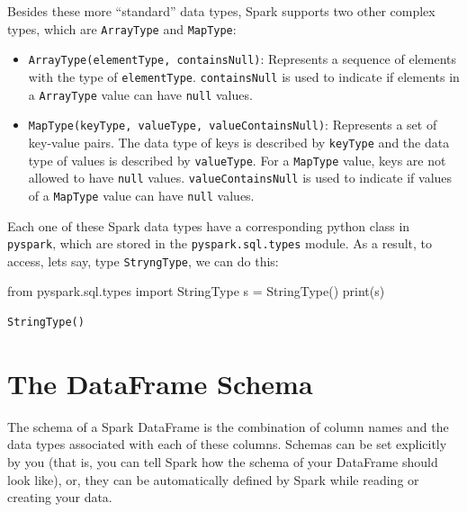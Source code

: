 \documentclass[
  11pt,
  letterpaper,
  DIV=11,
  numbers=noendperiod]{scrreprt}
\newenvironment{Shaded}{\begin{snugshade}}{\end{snugshade}}
\newcommand{\BuiltInTok}[1]{\textcolor[rgb]{0.00,0.23,0.31}{#1}}
\newcommand{\ImportTok}[1]{\textcolor[rgb]{0.00,0.46,0.62}{#1}}
\newcommand{\NormalTok}[1]{\textcolor[rgb]{0.00,0.23,0.31}{#1}}
\newcommand{\OperatorTok}[1]{\textcolor[rgb]{0.37,0.37,0.37}{#1}}
\begin{document}
Besides these more ``standard'' data types, Spark supports two other
complex types, which are \texttt{ArrayType} and \texttt{MapType}:

\begin{itemize}
\item
  \texttt{ArrayType(elementType,\ containsNull)}: Represents a sequence
  of elements with the type of \texttt{elementType}.
  \texttt{containsNull} is used to indicate if elements in a
  \texttt{ArrayType} value can have \texttt{null} values.
\item
  \texttt{MapType(keyType,\ valueType,\ valueContainsNull)}: Represents
  a set of key-value pairs. The data type of keys is described by
  \texttt{keyType} and the data type of values is described by
  \texttt{valueType}. For a \texttt{MapType} value, keys are not allowed
  to have \texttt{null} values. \texttt{valueContainsNull} is used to
  indicate if values of a \texttt{MapType} value can have \texttt{null}
  values.
\end{itemize}

Each one of these Spark data types have a corresponding python class in
\texttt{pyspark}, which are stored in the \texttt{pyspark.sql.types}
module. As a result, to access, lets say, type \texttt{StryngType}, we
can do this:

\begin{Shaded}
\begin{Highlighting}[]
\ImportTok{from}\NormalTok{ pyspark.sql.types }\ImportTok{import}\NormalTok{ StringType}
\NormalTok{s }\OperatorTok{=}\NormalTok{ StringType()}
\BuiltInTok{print}\NormalTok{(s)}
\end{Highlighting}
\end{Shaded}

\begin{verbatim}
StringType()
\end{verbatim}

\hypertarget{sec-dataframe-schema}{%
\section{The DataFrame Schema}\label{sec-dataframe-schema}}

The schema of a Spark DataFrame is the combination of column names and
the data types associated with each of these columns. Schemas can be set
explicitly by you (that is, you can tell Spark how the schema of your
DataFrame should look like), or, they can be automatically defined by
Spark while reading or creating your data.
\end{document}
